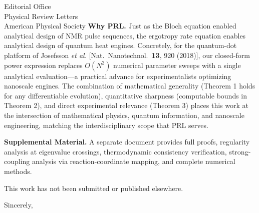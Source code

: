 \documentclass[12pt]{letter}
\begin{document}
\begin{letter}{Editorial Office\\Physical Review Letters\\American Physical Society}
\textbf{Why PRL.} Just as the Bloch equation enabled analytical design of NMR pulse sequences, the ergotropy rate equation enables analytical design of quantum heat engines. Concretely, for the quantum-dot platform of Josefsson \textit{et al.} [Nat.\ Nanotechnol.\ \textbf{13}, 920 (2018)], our closed-form power expression replaces $O(N^2)$ numerical parameter sweeps with a single analytical evaluation---a practical advance for experimentalists optimizing nanoscale engines. The combination of mathematical generality (Theorem 1 holds for any differentiable evolution), quantitative sharpness (computable bounds in Theorem 2), and direct experimental relevance (Theorem 3) places this work at the intersection of mathematical physics, quantum information, and nanoscale engineering, matching the interdisciplinary scope that PRL serves.

\textbf{Supplemental Material.} A separate document provides full proofs, regularity analysis at eigenvalue crossings, thermodynamic consistency verification, strong-coupling analysis via reaction-coordinate mapping, and complete numerical methods.

This work has not been submitted or published elsewhere.

\closing{Sincerely,}

\end{letter}
\end{document}
